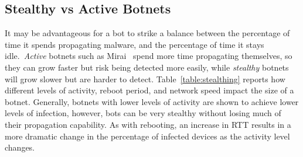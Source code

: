 \subsection{Stealthy vs Active Botnets}
\label{sub:stealthing_results}

It may be advantageous for a bot to strike a balance between the percentage of time it spends propagating malware, and the percentage of time it stays idle.~\emph{Active} botnets such as Mirai~\cite{kolias2017_Mirai_DDoS} spend more time propagating themselves, so they can grow faster but risk being detected more easily, while \emph{stealthy} botnets will grow slower but are harder to detect. Table~\ref{table:stealthing} reports how different levels of activity, reboot period, and network speed impact the size of a botnet. Generally, botnets with lower levels of activity are shown to achieve lower levels of infection, however, bots can be very stealthy without losing much of their propagation capability. As with rebooting, an increase in RTT results in a more dramatic change in the percentage of infected devices as the activity level changes.



